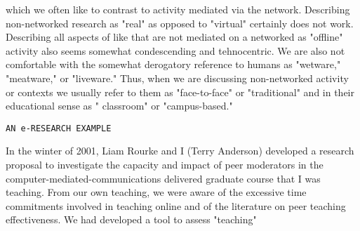 \documentclass{book}
\begin{document}
which we often like to contrast to activity mediated via the network. Describing
non-networked research as "real" as opposed to "virtual" certainly does not work.
Describing all aspects of like that are not mediated on a networked as "offline" activity also seems
somewhat condescending and tehnocentric. We are also not comfortable with the somewhat
derogatory reference to humans as "wetware," "meatware," or "liveware."
Thus, when we are discussing non-networked activity or contexts we usually refer to
them as "face-to-face" or "traditional" and in their educational sense as " classroom" or
"campus-based."\\
\begin{flushleft}
\texttt{AN e-RESEARCH EXAMPLE}
\hspace*{0.5cm}
\end{flushleft}
\vspace*{0.5cm}
In the winter of 2001, Liam Rourke and I (Terry Anderson) developed a research proposal
to investigate the capacity and impact of peer moderators in the computer-mediated-communications
delivered graduate course that I was teaching. From our own teaching, we were aware
of the excessive time commitments involved in teaching online and of the
literature on peer teaching effectiveness. We had developed a tool to assess "teaching"
\end{document}
